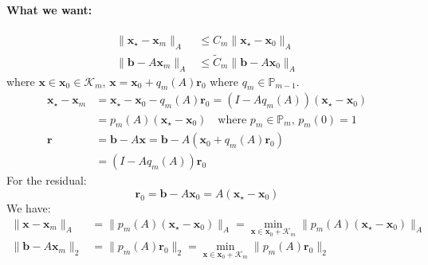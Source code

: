 \paragraph{What we want:}
\begin{align*}
    \|\mathbf{x}_{\star} - \mathbf{x}_m\|_A & \leq C_m \|\mathbf{x}_{\star} - \mathbf{x}_0\|_A \tag{CG}      \\
    \|\mathbf{b} - A \mathbf{x}_m\|_A       & \leq \tilde{C}_m \|\mathbf{b} - A \mathbf{x}_0\|_A \tag{GMRES}
\end{align*}
where $\mathbf{x} \in \mathbf{x}_0 \in \mathcal{K}_m$, $\mathbf{x} = \mathbf{x}_0 + q_m(A) \mathbf{r}_0$ where $q_m \in \mathbb{P}_{m-1}$.
\begin{align*}
    \mathbf{x}_{\star} - \mathbf{x}_m & = \mathbf{x}_{\star} - \mathbf{x}_0 - q_m(A) \mathbf{r}_0 = (I - A q_m(A)) (\mathbf{x}_{\star} - \mathbf{x}_0) \\
                                      & = p_m(A) (\mathbf{x}_{\star} - \mathbf{x}_0) \quad \text{where } p_m \in \mathbb{P}_m, \, p_m(0) = 1           \\
    \mathbf{r}                        & = \mathbf{b} - A \mathbf{x} = \mathbf{b} - A (\mathbf{x}_0 + q_m(A) \mathbf{r}_0)                              \\
                                      & = (I - A q_m(A)) \mathbf{r}_0
\end{align*}
For the residual:
\[
    \mathbf{r}_0 = \mathbf{b} - A \mathbf{x}_0 = A (\mathbf{x}_{\star} - \mathbf{x}_0)
\]
We have:
\begin{align*}
    \|\mathbf{x} - \mathbf{x}_m\|_A   & = \|p_m(A) (\mathbf{x}_{\star} - \mathbf{x}_0)\|_A = \min_{\mathbf{x} \in \mathbf{x}_0 + \mathcal{K}_m} \|p_m(A) (\mathbf{x}_{\star} - \mathbf{x}_0)\|_A \tag{CG} \\
    \|\mathbf{b} - A \mathbf{x}_m\|_2 & = \|p_m(A) \mathbf{r}_0\|_2 = \min_{\mathbf{x} \in \mathbf{x}_0 + \mathcal{K}_m} \|p_m(A) \mathbf{r}_0\|_2 \tag{GMRES}
\end{align*}

